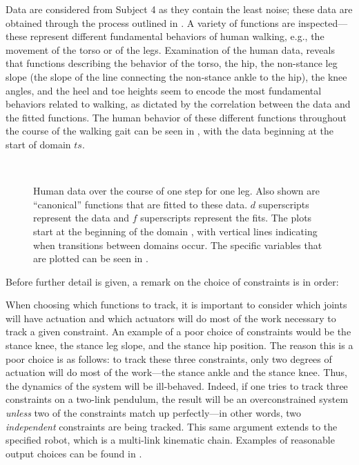 Data are considered from Subject 4 as they contain the least noise; these data
are obtained through the process outlined in .
%
A variety of functions are inspected---these represent different fundamental
behaviors of human walking, e.g., the movement of the torso or of the legs.
%
Examination of the human data, reveals that functions describing the behavior of
the torso, the hip, the non-stance leg slope (the slope of the line connecting
the non-stance ankle to the hip), the knee angles, and the heel and toe heights
seem to encode the most fundamental behaviors related to walking, as dictated by
the correlation between the data and the fitted functions.
%
The human behavior of these different functions throughout the course of the
walking gait can be seen in , with the data
beginning at the start of domain $ts$.

\begin{figure}[t!]
  \centering
  \\
  \caption[Human data over the course of one step for one leg.]{Human data over
    the course of one step for one leg.
    Also shown are ``canonical'' functions that are fitted to these data.
    $d$ superscripts represent the data and $f$ superscripts represent the
    fits.
    The plots start at the beginning of the domain {\DA}, with vertical lines
    indicating when transitions between domains occur.
    The specific variables that are plotted can be seen in
    .}
  \label{fig:constraints-fitting}
\end{figure}

Before further detail is given, a remark on the choice of constraints is in
order:
%
\begin{remark} \label{rmk:actuation}
  When choosing which functions to track, it is important to consider which
  joints will have actuation and which actuators will do most of the work
  necessary to track a given constraint.
  An example of a poor choice of constraints would be the stance knee, the
  stance leg slope, and the stance hip position.
  The reason this is a poor choice is as follows:
  to track these three constraints, only two degrees of actuation will do most
  of the work---the stance ankle and the stance knee.
  Thus, the dynamics of the system will be ill-behaved.
  Indeed, if one tries to track three constraints on a two-link pendulum, the
  result will be an overconstrained system {\em unless} two of the constraints
  match up perfectly---in other words, two {\em independent} constraints are
  being tracked.
  This same argument extends to the specified robot, which is a multi-link
  kinematic chain.
  Examples of reasonable output choices can be found in \cite{Sinnet2014}.
\end{remark}


